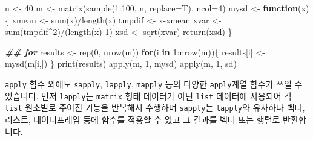 \documentclass[
]{book}
\newenvironment{Shaded}{\begin{snugshade}}{\end{snugshade}}
\newcommand{\AttributeTok}[1]{\textcolor[rgb]{0.77,0.63,0.00}{#1}}
\newcommand{\ControlFlowTok}[1]{\textcolor[rgb]{0.13,0.29,0.53}{\textbf{#1}}}
\newcommand{\DecValTok}[1]{\textcolor[rgb]{0.00,0.00,0.81}{#1}}
\newcommand{\DocumentationTok}[1]{\textcolor[rgb]{0.56,0.35,0.01}{\textbf{\textit{#1}}}}
\newcommand{\FunctionTok}[1]{\textcolor[rgb]{0.00,0.00,0.00}{#1}}
\newcommand{\NormalTok}[1]{#1}
\newcommand{\OtherTok}[1]{\textcolor[rgb]{0.56,0.35,0.01}{#1}}
\newcommand{\SpecialCharTok}[1]{\textcolor[rgb]{0.00,0.00,0.00}{#1}}
\begin{document}
\begin{Shaded}
\begin{Highlighting}[]
\NormalTok{n }\OtherTok{\textless{}{-}} \DecValTok{40}
\NormalTok{m }\OtherTok{\textless{}{-}} \FunctionTok{matrix}\NormalTok{(}\FunctionTok{sample}\NormalTok{(}\DecValTok{1}\SpecialCharTok{:}\DecValTok{100}\NormalTok{, n, }\AttributeTok{replace=}\NormalTok{T), }\AttributeTok{ncol=}\DecValTok{4}\NormalTok{)}
\NormalTok{mysd }\OtherTok{\textless{}{-}} \ControlFlowTok{function}\NormalTok{(x)\{}
\NormalTok{  xmean }\OtherTok{\textless{}{-}} \FunctionTok{sum}\NormalTok{(x)}\SpecialCharTok{/}\FunctionTok{length}\NormalTok{(x)}
\NormalTok{  tmpdif }\OtherTok{\textless{}{-}}\NormalTok{ x}\SpecialCharTok{{-}}\NormalTok{xmean}
\NormalTok{  xvar }\OtherTok{\textless{}{-}} \FunctionTok{sum}\NormalTok{(tmpdif}\SpecialCharTok{\^{}}\DecValTok{2}\NormalTok{)}\SpecialCharTok{/}\NormalTok{(}\FunctionTok{length}\NormalTok{(x)}\SpecialCharTok{{-}}\DecValTok{1}\NormalTok{)}
\NormalTok{  xsd }\OtherTok{\textless{}{-}} \FunctionTok{sqrt}\NormalTok{(xvar)}
  \FunctionTok{return}\NormalTok{(xsd)}
\NormalTok{\}}

\DocumentationTok{\#\# for }
\NormalTok{results }\OtherTok{\textless{}{-}} \FunctionTok{rep}\NormalTok{(}\DecValTok{0}\NormalTok{, }\FunctionTok{nrow}\NormalTok{(m))}
\ControlFlowTok{for}\NormalTok{(i }\ControlFlowTok{in} \DecValTok{1}\SpecialCharTok{:}\FunctionTok{nrow}\NormalTok{(m))\{}
\NormalTok{  results[i] }\OtherTok{\textless{}{-}} \FunctionTok{mysd}\NormalTok{(m[i,])}
\NormalTok{\}}
\FunctionTok{print}\NormalTok{(results)}
\FunctionTok{apply}\NormalTok{(m, }\DecValTok{1}\NormalTok{, mysd)}
\FunctionTok{apply}\NormalTok{(m, }\DecValTok{1}\NormalTok{, sd)}
\end{Highlighting}
\end{Shaded}

\texttt{apply} 함수 외에도 \texttt{sapply}, \texttt{lapply}, \texttt{mapply} 등의 다양한 \texttt{apply}계열 함수가 쓰일 수 있습니다. 먼저 \texttt{lapply}는 \texttt{matrix} 형태 데이터가 아닌 \texttt{list} 데이터에 사용되어 각 \texttt{list} 원소별로 주어진 기능을 반복해서 수행하며 \texttt{sapply}는 \texttt{lapply}와 유사하나 벡터, 리스트, 데이터프레임 등에 함수를 적용할 수 있고 그 결과를 벡터 또는 행렬로 반환합니다.
\end{document}
